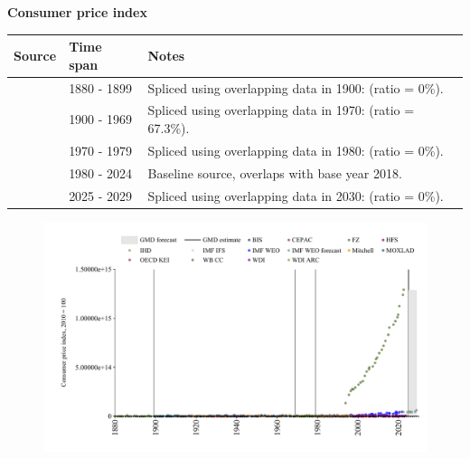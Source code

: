 \documentclass[12pt,a4paper,landscape]{article}
\begin{document}
\begin{adjustbox}{max totalsize={\paperwidth}{\paperheight},center}
\begin{minipage}[t][\textheight][t]{\textwidth}
\vspace*{0.5cm}
{}
\begin{center}
{\Large\bfseries Consumer price index}
\end{center}
\vspace{0.5cm}
\begin{table}[H]
\centering
\small
\begin{tabular}{|l|l|l|}
\hline
\textbf{Source} & \textbf{Time span} & \textbf{Notes} \\
\hline
\rowcolor{white}\cite{FZ}& 1880 - 1899 &Spliced using overlapping data in 1900: (ratio = 0\%). \\
\rowcolor{lightgray}\cite{MOXLAD}& 1900 - 1969 &Spliced using overlapping data in 1970: (ratio = 67.3\%). \\
\rowcolor{white}\cite{WB_CC}& 1970 - 1979 &Spliced using overlapping data in 1980: (ratio = 0\%). \\
\rowcolor{lightgray}\cite{BIS}& 1980 - 2024 &Baseline source, overlaps with base year 2018. \\
\rowcolor{white}\cite{IMF_WEO_forecast}& 2025 - 2029 &Spliced using overlapping data in 2030: (ratio = 0\%). \\
\hline
\end{tabular}
\end{table}
\begin{figure}[H]
\centering
\includegraphics[width=\textwidth,height=0.6\textheight,keepaspectratio]{graphs/BRA_CPI.pdf}
\end{figure}
\end{minipage}
\end{adjustbox}
\end{document}
